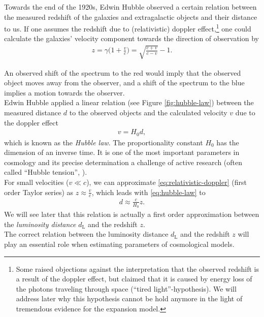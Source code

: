\noindent Towards the end of the 1920s, Edwin Hubble observed a certain relation between the measured redshift of the galaxies and extragalactic objects and their distance to us. If one assumes the redshift due to (relativistic) doppler effect,\footnote{Some raised objections against the interpretation that the observed redshift is a result of the doppler effect, but claimed that it is caused by energy loss of the photons traveling through space (``tired light''-hypothesis). We will address later why this hypothesis cannot be hold anymore in the light of tremendous evidence for the expansion model.} one could calculate the galaxies' velocity component towards the direction of observation by
\begin{align}
    z = \gamma \biggl( 1 + \frac{v}{c} \biggr) = \sqrt{\frac{c + v}{c - v}} - 1. \label{eq:relativistic-doppler}
\end{align} 

\noindent An observed shift of the spectrum to the red would imply that the observed object moves away from the observer, and a shift of the spectrum to the blue implies a motion towards the observer. \\
\noindent Edwin Hubble applied a linear relation (see Figure \ref{fig:hubble-law}) between the measured distance $d$ to the observed objects and the calculated velocity $v$ due to the doppler effect
\begin{align}
    v = H_{0} d, \label{eq:hubble-law}
\end{align}
which is known as the \textit{Hubble law}. The proportionality constant $H_{0}$ has the dimension of an inverse time. It is one of the most important parameters in cosmology and its precise determination a challenge of active research (often called ``Hubble tension'', \cite{DiValentino2021}). \\ 

\noindent For small velocities ($v \ll c$), we can approximate \eqref{eq:relativistic-doppler} (first order Taylor series) as $\displaystyle z \approx \frac{v}{c}$, which leads with \eqref{eq:hubble-law} to 
\begin{align}
    d \approx \frac{c}{H_{0}} z. \label{eq:lum-dist-approx} 
\end{align}
We will see later that this relation is actually a first order approximation between the \textit{luminosity distance} $d_{\text{L}}$ and the redshift $z$. \\
The correct relation between the luminosity distance $d_{\text{L}}$ and the redshift $z$ will play an essential role when estimating parameters of cosmological models.

